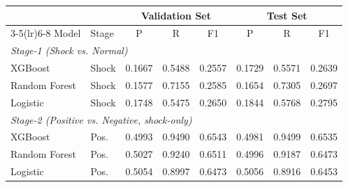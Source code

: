 \begin{tabular*}{\linewidth}{@{\extracolsep{\fill}}ll ccc ccc@{}}
\toprule
& & \multicolumn{3}{c}{\textbf{Validation Set}} & \multicolumn{3}{c}{\textbf{Test Set}} \\
\cmidrule(lr){3-5}\cmidrule(lr){6-8}
Model & Stage & P & R & F1 & P & R & F1 \\
\midrule
\multicolumn{8}{l}{\textit{Stage-1 (Shock vs. Normal)}} \\
XGBoost      & Shock & 0.1667 & 0.5488 & 0.2557 & 0.1729 & 0.5571 & 0.2639 \\
Random Forest & Shock & 0.1577 & 0.7155 & 0.2585 & 0.1654 & 0.7305 & 0.2697 \\
Logistic     & Shock & 0.1748 & 0.5475 & 0.2650 & 0.1844 & 0.5768 & 0.2795 \\
\midrule
\multicolumn{8}{l}{\textit{Stage-2 (Positive vs. Negative, shock-only)}} \\
XGBoost      & Pos. & 0.4993 & 0.9490 & 0.6543 & 0.4981 & 0.9499 & 0.6535 \\
Random Forest & Pos. & 0.5027 & 0.9240 & 0.6511 & 0.4996 & 0.9187 & 0.6473 \\
Logistic     & Pos. & 0.5054 & 0.8997 & 0.6473 & 0.5056 & 0.8916 & 0.6453 \\
\bottomrule
\end{tabular*}
